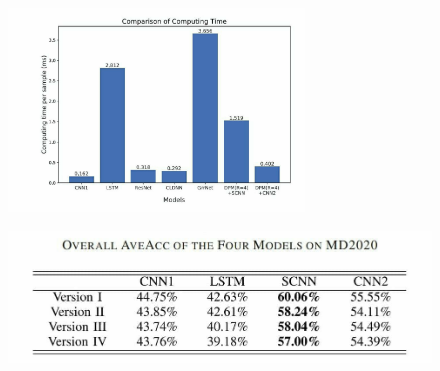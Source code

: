 \documentclass{beamer}
\begin{document}
\begin{frame}
     \begin{figure}[h]
    \centering
    \includegraphics[width=0.7\textwidth]{fig 5.jpeg}
\end{figure} 
\end{frame}

\begin{frame}
     \begin{figure}[h]
    \centering
    \includegraphics[width=\textwidth]{tab 3.jpeg}
\end{figure} 
\end{frame}
\end{document}
